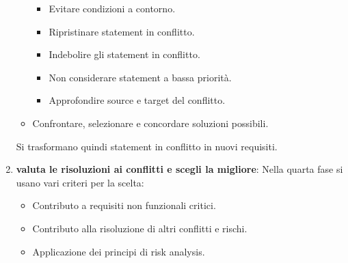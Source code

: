 \begin{enumerate}
\begin{itemize}
                        \begin{itemize}
                              \item Evitare condizioni a contorno.
                              \item Ripristinare statement in conflitto.
                              \item Indebolire gli statement in conflitto.
                              \item Non considerare statement a bassa priorità.
                              \item Approfondire source e target del conflitto.
                        \end{itemize}
                  \item Confrontare, selezionare e concordare soluzioni possibili.
            \end{itemize}
            Si trasformano quindi statement in conflitto in nuovi requisiti.
      \item \textbf{valuta le risoluzioni ai conflitti e scegli la migliore}:
            Nella quarta fase si usano vari criteri per la scelta:
            \begin{itemize}
                  \item Contributo a requisiti non funzionali critici.
                  \item Contributo alla risoluzione di altri conflitti e rischi.
                  \item Applicazione dei principi di risk analysis.
            \end{itemize}
\end{enumerate}


